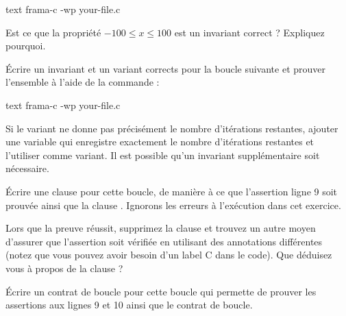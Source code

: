\begin{CodeBlock}{text}
frama-c -wp your-file.c
\end{CodeBlock}




Est ce que la propriété $-100 \leq x \leq 100$ est un invariant correct ?
Expliquez pourquoi.





Écrire un invariant et un variant corrects pour la boucle suivante et prouver
l'ensemble à l'aide de la commande :

\begin{CodeBlock}{text}
frama-c -wp your-file.c
\end{CodeBlock}




Si le variant ne donne pas précisément le nombre d'itérations restantes, ajouter
une variable qui enregistre exactement le nombre d'itérations restantes et l'utiliser
comme variant. Il est possible qu'un invariant supplémentaire soit nécessaire.





Écrire une clause  pour cette boucle, de manière à ce
que l'assertion ligne 9 soit prouvée ainsi que la clause .
Ignorons les erreurs à l'exécution dans cet exercice.





Lors que la preuve réussit, supprimez la clause  et
trouvez un autre moyen d'assurer que l'assertion soit vérifiée en utilisant des
annotations différentes (notez que vous pouvez avoir besoin d'un label C dans le
code). Que déduisez vous à propos de la clause  ?




Écrire un contrat de boucle pour cette boucle qui permette de prouver les
assertions aux lignes 9 et 10 ainsi que le contrat de boucle.



